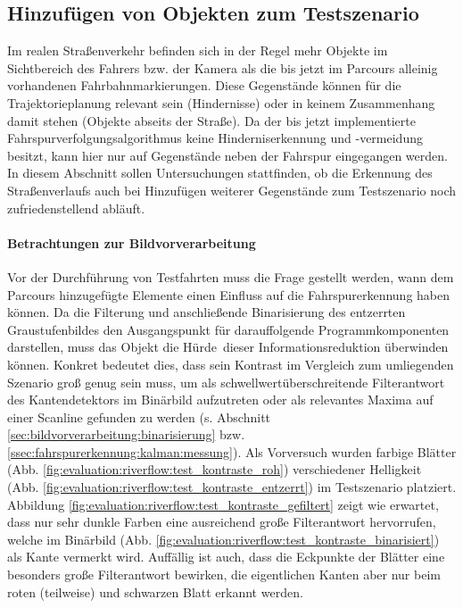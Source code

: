 \subsection{Hinzufügen von Objekten zum Testszenario \dcsecondauthorshort}
\label{ssec:evaluation:messungen:objekte_hinzufuegen}
Im realen Straßenverkehr befinden sich in der Regel mehr Objekte im Sichtbereich des Fahrers bzw. der Kamera als die bis jetzt im Parcours alleinig vorhandenen Fahrbahnmarkierungen. Diese Gegenstände können für die Trajektorieplanung relevant sein (Hindernisse) oder in keinem Zusammenhang damit stehen (Objekte abseits der Straße). Da der bis jetzt implementierte Fahrspurverfolgungsalgorithmus keine Hinderniserkennung und -vermeidung besitzt, kann hier nur auf Gegenstände neben der Fahrspur eingegangen werden. In diesem Abschnitt sollen Untersuchungen stattfinden, ob die Erkennung des Straßenverlaufs auch bei Hinzufügen weiterer Gegenstände zum Testszenario noch zufriedenstellend abläuft.

\paragraph{Betrachtungen zur Bildvorverarbeitung}
\label{par:evaluation:riverflow:messungen:objekte_hinzufuegen}
Vor der Durchführung von Testfahrten muss die Frage gestellt werden, wann dem Parcours hinzugefügte Elemente einen Einfluss auf die Fahrspurerkennung haben können. Da die Filterung und anschließende Binarisierung des entzerrten Graustufenbildes den Ausgangspunkt für darauffolgende Programmkomponenten darstellen, muss das Objekt die \glqq Hürde\grqq\ dieser Informationsreduktion überwinden können. Konkret bedeutet dies, dass sein Kontrast im Vergleich zum umliegenden Szenario groß genug sein muss, um als schwellwertüberschreitende Filterantwort des Kantendetektors im Binärbild aufzutreten oder als relevantes Maxima auf einer Scanline gefunden zu werden (s. Abschnitt \ref{sec:bildvorverarbeitung:binarisierung} bzw. \ref{ssec:fahrspurerkennung:kalman:messung}).
Als Vorversuch wurden farbige Blätter (Abb. \ref{fig:evaluation:riverflow:test_kontraste_roh}) verschiedener Helligkeit (Abb. \ref{fig:evaluation:riverflow:test_kontraste_entzerrt}) im Testszenario platziert. Abbildung \ref{fig:evaluation:riverflow:test_kontraste_gefiltert} zeigt wie erwartet, dass nur sehr dunkle Farben eine ausreichend große Filterantwort hervorrufen, welche im Binärbild (Abb. \ref{fig:evaluation:riverflow:test_kontraste_binarisiert}) als Kante vermerkt wird. Auffällig ist auch, dass die Eckpunkte der Blätter eine besonders große Filterantwort bewirken, die eigentlichen Kanten aber nur beim roten (teilweise) und schwarzen Blatt erkannt werden.

